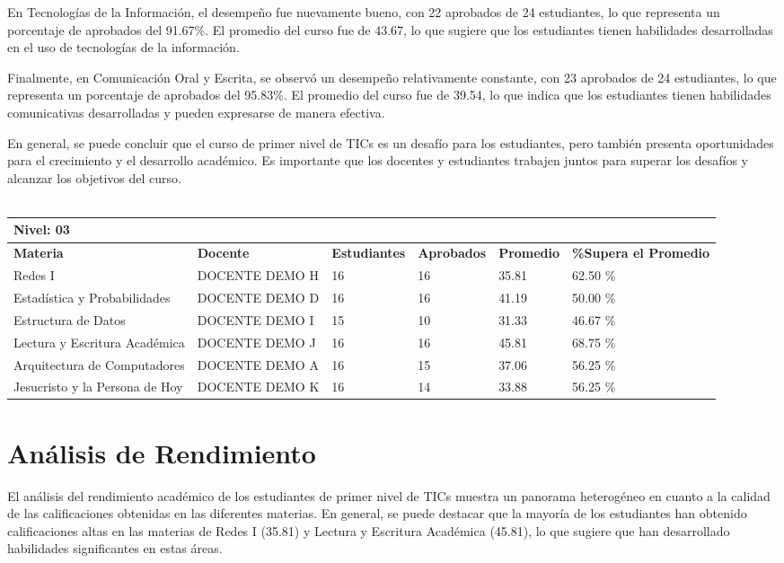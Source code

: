 En Tecnologías de la Información, el desempeño fue nuevamente bueno, con 22 aprobados de 24 estudiantes, lo que representa un porcentaje de aprobados del 91.67\%. El promedio del curso fue de 43.67, lo que sugiere que los estudiantes tienen habilidades desarrolladas en el uso de tecnologías de la información.

Finalmente, en Comunicación Oral y Escrita, se observó un desempeño relativamente constante, con 23 aprobados de 24 estudiantes, lo que representa un porcentaje de aprobados del 95.83\%. El promedio del curso fue de 39.54, lo que indica que los estudiantes tienen habilidades comunicativas desarrolladas y pueden expresarse de manera efectiva.

En general, se puede concluir que el curso de primer nivel de TICs es un desafío para los estudiantes, pero también presenta oportunidades para el crecimiento y el desarrollo académico. Es importante que los docentes y estudiantes trabajen juntos para superar los desafíos y alcanzar los objetivos del curso.\\
\vspace{1cm}\\\small
\begin{tabularx}{\textwidth}{|p{2.5cm}|p{2.5cm}|X|X|X|X|}
\hline
\multicolumn{6}{|X|}{\textbf{Nivel: 03 }}\\\hline\textbf{Materia} & \textbf{Docente} & \textbf{Estudiantes} & \textbf{Aprobados} & \textbf{Promedio} & \textbf{\%Supera el Promedio} \\ \hline
Redes I & DOCENTE DEMO H & 16 & 16 & 35.81 & 62.50 \%\\ \hline
Estadística y Probabilidades & DOCENTE DEMO D & 16 & 16 & 41.19 & 50.00 \%\\ \hline
Estructura de Datos & DOCENTE DEMO I & 15 & 10 & 31.33 & 46.67 \%\\ \hline
Lectura y Escritura Académica & DOCENTE DEMO J  & 16 & 16 & 45.81 & 68.75 \%\\ \hline
Arquitectura de Computadores & DOCENTE DEMO A & 16 & 15 & 37.06 & 56.25 \%\\ \hline
Jesucristo y la Persona de Hoy & DOCENTE DEMO K & 16 & 14 & 33.88 & 56.25 \%\\ \hline
\end{tabularx}

\vspace{1cm}
\section{Análisis de Rendimiento}
El análisis del rendimiento académico de los estudiantes de primer nivel de TICs muestra un panorama heterogéneo en cuanto a la calidad de las calificaciones obtenidas en las diferentes materias. En general, se puede destacar que la mayoría de los estudiantes han obtenido calificaciones altas en las materias de Redes I (35.81) y Lectura y Escritura Académica (45.81), lo que sugiere que han desarrollado habilidades significantes en estas áreas.


